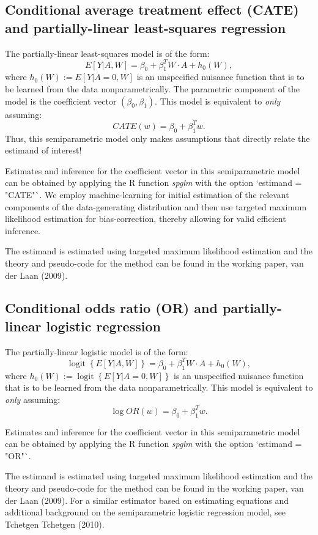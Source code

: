\documentclass{article}
\DeclareMathOperator{\logit}{logit}
\begin{document}
\subsection{Conditional average treatment effect (CATE) and partially-linear least-squares regression}
The partially-linear least-squares model is of the form:
$$E[Y|A,W] = \beta_0 + \beta_1^T W \cdot A + h_0(W),$$
where $ h_0(W) := E[Y|A=0,W]$ is an unspecified nuisance function that is to be learned from the data nonparametrically. The parametric component of the model is the coefficient vector $(\beta_0, \beta_1)$. This model is equivalent to \textit{only} assuming:
$$CATE(w) = \beta_0 + \beta_1^T w.$$
Thus, this semiparametric model only makes assumptions that directly relate the estimand of interest!

Estimates and inference for the coefficient vector in this semiparametric model can be obtained by applying the R function \textit{spglm} with the option `estimand = "CATE"`. We employ machine-learning for initial estimation of the relevant components of the data-generating distribution and then use targeted maximum likelihood estimation for bias-correction, thereby allowing for valid efficient inference.

The estimand is estimated using targeted maximum likelihood estimation and the theory and pseudo-code for the method can be found in the working paper, van der Laan (2009). \nocite{OddsRatioreadingsTMLE}

\subsection{Conditional odds ratio (OR) and partially-linear logistic regression}
The partially-linear logistic model is of the form:
$$\logit\left\{E[Y|A,W]\right\} = \beta_0 + \beta_1^T W \cdot A + h_0(W),$$
where $ h_0(W) := \logit\left\{E[Y|A=0,W]\right\}$ is an unspecified nuisance function that is to be learned from the data nonparametrically. This model is equivalent to \textit{only} assuming:
$$\log OR(w) = \beta_0 + \beta_1^T w.$$

Estimates and inference for the coefficient vector in this semiparametric model can be obtained by applying the R function \textit{spglm} with the option `estimand = "OR"`. 

The estimand is estimated using targeted maximum likelihood estimation and the theory and pseudo-code for the method can be found in the working paper, van der Laan (2009). \nocite{OddsRatioreadingsTMLE}
For a similar estimator based on estimating equations and additional background on the semiparametric logistic regression model, see Tchetgen Tchetgen (2010). \nocite{TchetgenOddsRatio}
\end{document}
